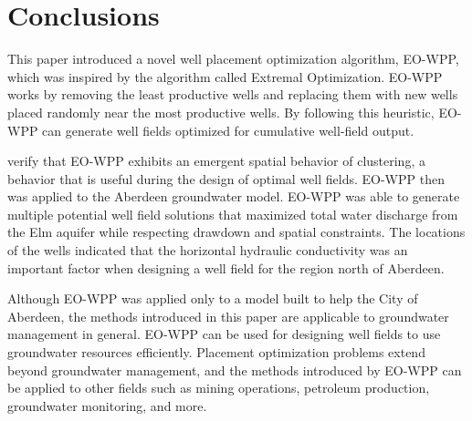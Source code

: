 \documentclass[authoryear]{elsarticle}
\begin{document}
\section{Conclusions}
This paper introduced a novel well placement optimization algorithm, EO-WPP, which was inspired by the  algorithm called Extremal Optimization. EO-WPP works by removing the least productive wells and replacing them with new wells placed randomly near the most productive wells. By following this heuristic, EO-WPP can  generate well fields optimized for cumulative well-field output.

  verify that EO-WPP exhibits an emergent spatial behavior of clustering, a behavior that is useful during the design of optimal well fields. EO-WPP then was applied to the Aberdeen groundwater model. EO-WPP was able to generate multiple potential well field solutions that maximized total water discharge from the Elm aquifer while respecting drawdown and spatial constraints. The locations of the wells indicated that the horizontal hydraulic conductivity was an important factor when designing a well field for the region north of Aberdeen.

Although EO-WPP was applied only to a model built to help the City of Aberdeen, the methods introduced in this paper are applicable to groundwater management in general. EO-WPP can be used for designing well fields to use groundwater resources efficiently. Placement optimization problems extend beyond groundwater management, and the methods introduced by EO-WPP can be applied to other fields such as mining operations, petroleum production, groundwater monitoring, and more.
\end{document}
